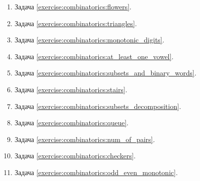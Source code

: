 \begin{enumerate}[label=\textbf{№\arabic*}:]
    \item Задача \ref{exercise:combinatorics:flowers}.
    \item Задача \ref{exercise:combinatorics:triangles}.
    \item Задача \ref{exercise:combinatorics:monotonic_digits}.
    \item Задача \ref{exercise:combinatorics:at_least_one_vowel}.
    \item Задача \ref{exercise:combinatorics:subsets_and_binary_words}.
    \item Задача \ref{exercise:combinatorics:stairs}.
    \item Задача \ref{exercise:combinatorics:subsets_decomposition}.
    \item Задача \ref{exercise:combinatorics:queue}.
    \item Задача \ref{exercise:combinatorics:num_of_pairs}.
    \item Задача \ref{exercise:combinatorics:checkers}.
    \item Задача \ref{exercise:combinatorics:odd_even_monotonic}.
\end{enumerate}



